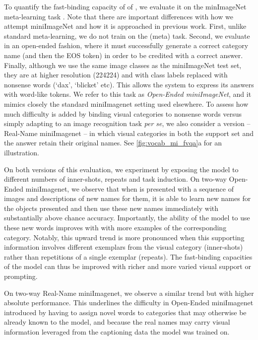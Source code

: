 To quantify the fast-binding capacity of of \Model, we evaluate it on the minImageNet meta-learning task \cite{vinyals2016matching}. Note that there are important differences with how we attempt miniImageNet and how it is approached in previous work. First, unlike standard meta-learning, we do not train \Model on the (meta) task. Second, we evaluate \Model in an open-ended fashion, where it must successfully generate a correct category name (and then the EOS token) in order to be credited with a correct answer. Finally, although we use the same image classes as the miniImageNet test set, they are at higher resolution (224224) and with class labels replaced with nonsense words (`dax', `blicket' etc). This allows the system to express its answers with word-like tokens. We refer to this task as \emph{Open-Ended miniImageNet}, and it mimics closely the standard miniImagenet setting used elsewhere. To assess how much difficulty is added by binding visual categories to nonsense words versus simply adapting to an image recognition task \emph{per se}, we also consider a version --  Real-Name miniImagenet -- in which visual categories in both the support set and the answer retain their original names. See \autoref{fig:vocab_mi_fvqa}a for an illustration. 

On both versions of this evaluation, we experiment by exposing the model to different numbers of inner-shots, repeats and task induction. On two-way Open-Ended miniImagenet, we observe that when \Model is presented with a sequence of images and descriptions of new names for them, it is able to learn new names for the objects presented and then use these new names immediately with substantially above chance accuracy. Importantly, the ability of the model to use these new words improves with with more examples of the corresponding category. Notably, this upward trend is more pronounced when this supporting information involves different exemplars from the visual category (inner-shots) rather than repetitions of a single exemplar (repeats). The fast-binding capacities of the model can thus be improved with richer and more varied visual support or prompting.

On two-way Real-Name miniImagenet, we observe a similar trend but with higher absolute performance. This underlines the difficulty in Open-Ended miniImagenet introduced by having to assign novel words to categories that may otherwise be already known to the model, and because the real names may carry visual information leveraged from the captioning data the model was trained on. 

